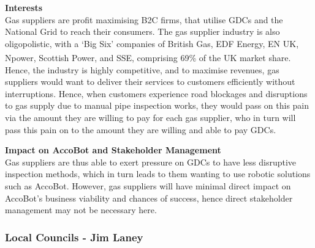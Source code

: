\documentclass[11pt]{article}		%
\newcommand{\supercite}[1]{\textsuperscript{\cite{#1}}}		%
\begin{document}
		\textbf{Interests}
		\\
	    Gas suppliers are profit maximising B2C firms, that utilise GDCs and the National Grid to reach their consumers. The gas supplier industry is also oligopolistic, with a ‘Big Six’ companies of British Gas, EDF Energy, EN UK, Npower, Scottish Power, and SSE, comprising 69\% of the UK market share\supercite{big6}. 
        \\
        \hspace*{3ex}Hence, the industry is highly competitive, and to maximise revenues, gas suppliers would want to deliver their services to customers efficiently without interruptions. Hence, when customers experience road blockages and disruptions to gas supply due to manual pipe inspection works, they would pass on this pain via the amount they are willing to pay for each gas supplier, who in turn will pass this pain on to the amount they are willing and able to pay GDCs.
        
		\textbf{Impact on AccoBot and Stakeholder Management}
		\\
		Gas suppliers are thus able to exert pressure on GDCs to have less disruptive inspection methods, which in turn leads to them wanting to use robotic solutions such as AccoBot. However, gas suppliers will have minimal direct impact on AccoBot’s business viability and chances of success, hence direct stakeholder management may not be necessary here. 
		
		\subsubsection[Local Councils]{Local Councils - Jim Laney}
			
\end{document}
